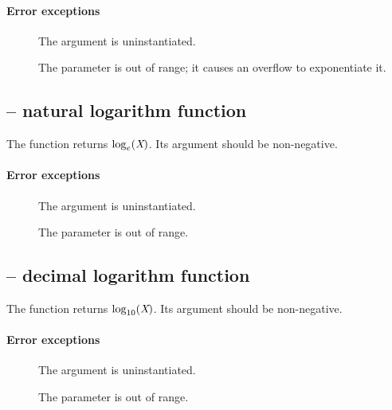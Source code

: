 \paragraph{Error exceptions}
\begin{description}
\item[]
The argument is uninstantiated.
\item[]
The parameter is out of range; it causes an overflow to exponentiate it.
\end{description}

\subsection{ -- natural logarithm function}
\label{arith:log}

     
The  function returns $\log_e({{\mbox{\rm\em X}})}$. Its argument should be non-negative.
        
\paragraph{Error exceptions}
\begin{description}
\item[]
The argument is uninstantiated.
\item[]
The parameter is out of range.
\end{description}

\subsection{ -- decimal logarithm function}
\label{arith:log10}

     
The  function returns $\log_{10}({{\mbox{\rm\em X}})}$.  Its argument should be non-negative.
        
\paragraph{Error exceptions}
\begin{description}
\item[]
The argument is uninstantiated.
\item[]
The parameter is out of range.
\end{description}

